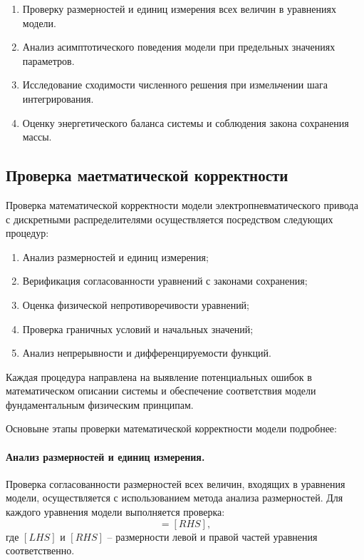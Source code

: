\begin{enumerate}
    \item Проверку размерностей и единиц измерения всех величин в уравнениях модели.
    \item    Анализ асимптотического поведения модели при предельных значениях параметров.
    \item Исследование сходимости численного решения при измельчении шага интегрирования.
    \item Оценку энергетического баланса системы и соблюдения закона сохранения массы.
\end{enumerate}

\subsection{Проверка маетматической корректности}\label{sec:ch2/sec7/subsec2}

Проверка математической корректности модели электропневматического привода с дискретными распределителями осуществляется посредством следующих процедур:

\begin{enumerate}
    \item Анализ размерностей и единиц измерения;
    \item Верификация согласованности уравнений с законами сохранения;
    \item Оценка физической непротиворечивости уравнений;
    \item Проверка граничных условий и начальных значений;
    \item Анализ непрерывности и дифференцируемости функций.
\end{enumerate}

Каждая процедура направлена на выявление потенциальных ошибок в математическом описании
системы и обеспечение соответствия модели фундаментальным физическим принципам.

Основыне этапы проверки математической корректности модели подробнее:

\paragraph{Анализ размерностей и единиц измерения.}

Проверка согласованности размерностей всех величин, входящих в уравнения модели, осуществляется с использованием метода анализа размерностей. Для каждого уравнения модели выполняется проверка:
\begin{equation*}
    [LHS] = [RHS],
\end{equation*}
где $[LHS]$ и $[RHS]$ -- размерности левой и правой частей уравнения соответственно.

